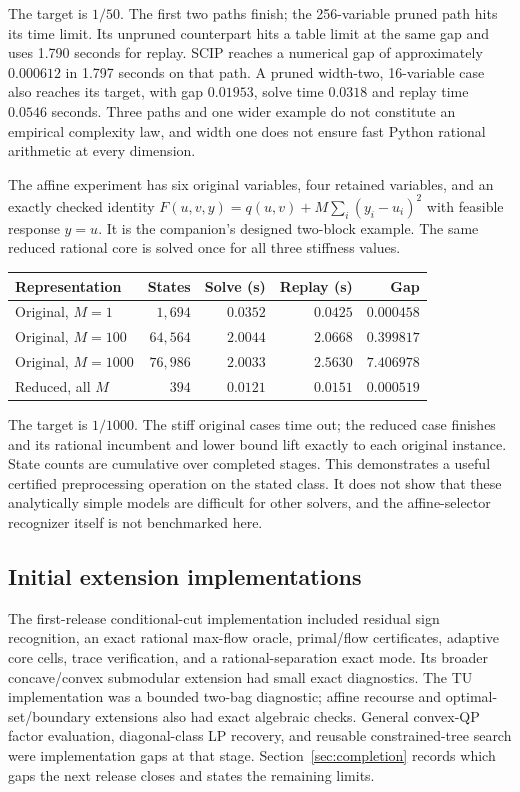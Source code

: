 The target is $1/50$. The first two paths finish; the 256-variable
pruned path hits its time limit. Its unpruned counterpart hits a table
limit at the same gap and uses 1.790 seconds for replay. SCIP reaches
a numerical gap of approximately $0.000612$ in 1.797 seconds on that
path. A pruned width-two, 16-variable case also reaches its target, with
gap $0.01953$, solve time $0.0318$ and replay time $0.0546$ seconds.
Three paths and one wider example do not constitute an empirical
complexity law, and width one does not ensure fast Python rational
arithmetic at every dimension.

The affine experiment has six original variables, four retained
variables, and an exactly checked identity
$F(u,v,y)=q(u,v)+M\sum_i(y_i-u_i)^2$ with feasible response $y=u$.
It is the companion's designed two-block example. The same reduced
rational core is solved once for all three stiffness values.

\begin{center}
\begin{tabular}{lrrrr}
\toprule
Representation & States & Solve (s) & Replay (s) & Gap\\
\midrule
Original, $M=1$ & $1{,}694$ & $0.0352$ & $0.0425$ & $0.000458$\\
Original, $M=100$ & $64{,}564$ & $2.0044$ & $2.0668$ & $0.399817$\\
Original, $M=1000$ & $76{,}986$ & $2.0033$ & $2.5630$ & $7.406978$\\
Reduced, all $M$ & $394$ & $0.0121$ & $0.0151$ & $0.000519$\\
\bottomrule
\end{tabular}
\end{center}

The target is $1/1000$. The stiff original cases time out; the reduced
case finishes and its rational incumbent and lower bound lift exactly
to each original instance. State counts are cumulative over completed
stages. This demonstrates a useful certified
preprocessing operation on the stated class. It does not show that
these analytically simple models are difficult for other solvers, and
the affine-selector recognizer itself is not benchmarked here.

\subsection{Initial extension implementations}
The first-release conditional-cut implementation included residual sign
recognition, an exact rational max-flow oracle, primal/flow certificates,
adaptive core cells, trace verification, and a rational-separation exact
mode. Its broader concave/convex submodular extension had small exact
diagnostics. The TU implementation was a bounded two-bag diagnostic;
affine recourse and optimal-set/boundary extensions also had exact
algebraic checks. General convex-QP factor evaluation, diagonal-class LP
recovery, and reusable constrained-tree search were implementation gaps
at that stage. Section~\ref{sec:completion} records which gaps the next
release closes and states the remaining limits.

